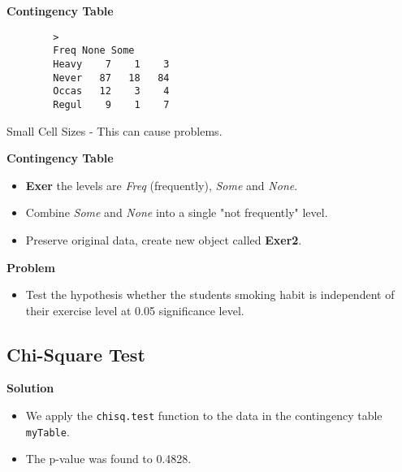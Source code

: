 \documentclass[a4paper,12pt]{article}
\begin{document}
	
	
	
	\textbf{Contingency Table }
	\begin{framed}
		\begin{verbatim}
		>    
		Freq None Some 
		Heavy    7    1    3 
		Never   87   18   84 
		Occas   12    3    4 
		Regul    9    1    7
		\end{verbatim}
	\end{framed}
	Small Cell Sizes - This can cause problems. 
	
	
	
	
	\textbf{Contingency Table }
	
	
	\begin{itemize}
		\item \textbf{Exer} the levels are \textit{Freq} (frequently), \textit{Some} and \textit{None}.
		\item Combine \textit{Some} and \textit{None} into a  single "not frequently" level.
		\item Preserve original data, create new object called \textbf{Exer2}.
	\end{itemize}
	
	
	
	\textbf{Problem}\\
	\begin{itemize}
		\item Test the hypothesis whether the students smoking habit is independent of their exercise level at 0.05 significance level.
	\end{itemize}
	
	
	\subsection{Chi-Square Test}
	
	\textbf{Solution}\\
	\begin{itemize}
		\item We apply the \texttt{chisq.test} function to the data in the contingency table \texttt{myTable}.
		\item The p-value was found to 0.4828.
	\end{itemize}
	
\end{document}
